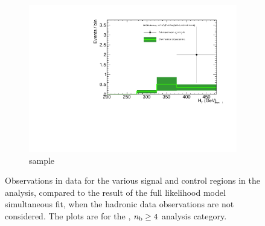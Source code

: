\begin{figure}[h!]
\begin{subfigure}[b]{0.48\textwidth}
    \includegraphics[width=\textwidth,page=4]
    {Figs/results/v0/greenBand/bestFit_2012dev_RQcdZero_fZinvAll_ge4b_ge4j-1_smOnly}
    \caption{\mj sample}
  \end{subfigure}
  \caption{Observations in data for the various signal and control
  regions in the analysis, compared to the result of the full likelihood model
  simultaneous fit, when the hadronic data observations are not considered. The
  plots are for the \njhigh, $n_{\text{b}} \geq 4$ analysis category.}
  \label{fig:green_fits_ge4b_ge4j}
\end{figure}


